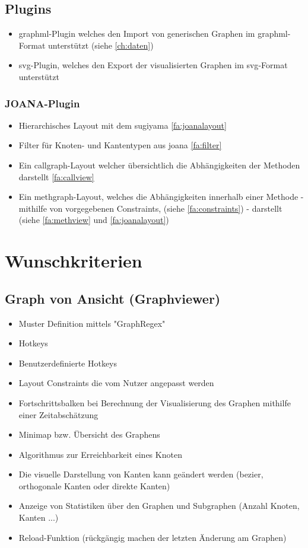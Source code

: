 \subsection{Plugins}
  \begin{itemize}
    \item \gls{graphml}-Plugin welches den Import von generischen Graphen im \gls{graphml}-Format unterstützt (siehe \ref{ch:daten})
    \item \gls{svg}-Plugin, welches den Export der visualisierten Graphen im \gls{svg}-Format unterstützt
  \end{itemize}
  
  \subsubsection{JOANA-Plugin}
    \begin{itemize}
      \item Hierarchisches Layout mit dem \gls{sugiyama} \ref{fa:joanalayout}
      \item Filter für Knoten- und Kantentypen aus \gls{joana} \ref{fa:filter}
      \item Ein \gls{callgraph}-Layout welcher übersichtlich die Abhängigkeiten der Methoden darstellt \ref{fa:callview}
      \item Ein \gls{methgraph}-Layout, welches die Abhängigkeiten innerhalb einer Methode - mithilfe von vorgegebenen Constraints, (siehe \ref{fa:constraints}) - darstellt (siehe \ref{fa:methview} und \ref{fa:joanalayout})
    \end{itemize}
  

\section{Wunschkriterien}

\subsection{Graph von Ansicht (Graphviewer)}
  \begin{itemize}
    \item Muster Definition mittels "GraphRegex"
    \item Hotkeys
    \item Benutzerdefinierte Hotkeys
    \item Layout Constraints die vom Nutzer angepasst werden
    \item Fortschrittsbalken bei Berechnung der Visualisierung des Graphen mithilfe einer Zeitabschätzung
    \item Minimap bzw. Übersicht des Graphens
    \item Algorithmus zur Erreichbarkeit eines Knoten
    \item Die visuelle Darstellung von Kanten kann geändert werden (\gls{bezier}, orthogonale Kanten oder direkte Kanten)
    \item Anzeige von Statistiken über den Graphen und Subgraphen (Anzahl Knoten, Kanten ...)
    \item Reload-Funktion (rückgängig machen der letzten Änderung am Graphen)
  \end{itemize}

